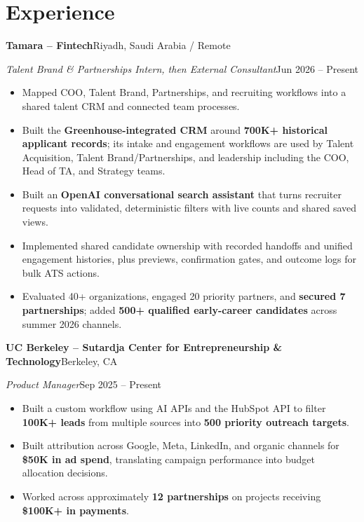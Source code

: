 \documentclass[a4paper,10pt]{article}
\newcommand{\entry}[4]{%
  \textbf{#1}\hfill #2\par
  \textit{#3}\hfill #4\par
}
\begin{document}
\section{Experience}
\entry{Tamara -- Fintech}{Riyadh, Saudi Arabia / Remote}
{Talent Brand \& Partnerships Intern, then External Consultant}{Jun 2026 -- Present}
\begin{itemize}
  \item Mapped COO, Talent Brand, Partnerships, and recruiting workflows into a shared talent CRM and connected team processes.
  \item Built the \textbf{Greenhouse-integrated CRM} around \textbf{700K+ historical applicant records}; its intake and engagement workflows are used by Talent Acquisition, Talent Brand/Partnerships, and leadership including the COO, Head of TA, and Strategy teams.
  \item Built an \textbf{OpenAI conversational search assistant} that turns recruiter requests into validated, deterministic filters with live counts and shared saved views.
  \item Implemented shared candidate ownership with recorded handoffs and unified engagement histories, plus previews, confirmation gates, and outcome logs for bulk ATS actions.
  \item Evaluated 40+ organizations, engaged 20 priority partners, and \textbf{secured 7 partnerships}; added \textbf{500+ qualified early-career candidates} across summer 2026 channels.
\end{itemize}
\entry{UC Berkeley -- Sutardja Center for Entrepreneurship \& Technology}{Berkeley, CA}
{Product Manager}{Sep 2025 -- Present}
\begin{itemize}
  \item Built a custom workflow using AI APIs and the HubSpot API to filter \textbf{100K+ leads} from multiple sources into \textbf{500 priority outreach targets}.
  \item Built attribution across Google, Meta, LinkedIn, and organic channels for \textbf{\$50K in ad spend}, translating campaign performance into budget allocation decisions.
  \item Worked across approximately \textbf{12 partnerships} on projects receiving \textbf{\$100K+ in payments}.
\end{itemize}
\end{document}
